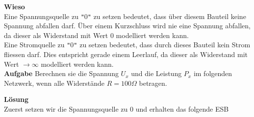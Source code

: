 																				 \textbf{Wieso} \\
																				 Eine Spannungsquelle zu \texttt{"}0\texttt{"} zu setzen bedeutet, dass über diesem Bauteil keine Spannung abfallen darf. Über einem Kurzschluss wird nie eine Spannung abfallen, da dieser als Widerstand mit Wert 0 modelliert werden kann. \\
																				 Eine Stromquelle zu \texttt{"}0\texttt{"} zu setzen bedeutet, dass durch dieses Bauteil kein Strom fliessen darf. Dies entspricht gerade einem Leerlauf, da dieser als Widerstand mit Wert $\displaystyle \rightarrow \infty$ modelliert werden kann. \\


																				 \beginbsp
																					\textbf{Aufgabe} Berechnen sie die Spannung $U_x$ und die Leistung $P_x$ im folgenden Netzwerk, wenn alle Widerstände $ R = 100 \Omega$ betragen. \\
																					\begin{center}
																						\fix
																					\end{center}
																					\iend

																					\beginip
																					\textbf{Lösung}
																					\\
																					Zuerst setzen wir die Spannungsquelle zu 0 und erhalten das folgende ESB \\
																					\begin{center}
																						\fix
																					\end{center}


